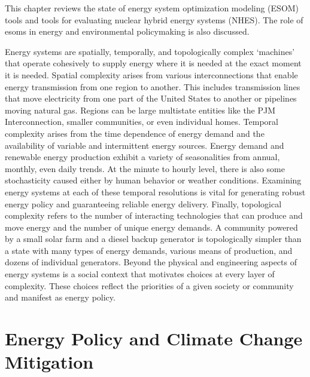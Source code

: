 This chapter reviews the state of energy system optimization modeling (ESOM) tools
and tools for evaluating nuclear hybrid energy systems (NHES). The role of \glspl{esom}
in energy and environmental policymaking is also discussed.

Energy systems are spatially, temporally, and topologically complex ‘machines’
that operate cohesively to supply energy where it is needed at the exact moment
it is needed. Spatial complexity arises from various interconnections that enable
energy transmission from one region to another. This includes transmission
lines that move electricity from one part of the United States to another or
pipelines moving natural gas. Regions can be large multistate entities like the
PJM Interconnection, smaller communities, or even individual homes. Temporal
complexity arises from the time dependence of energy demand and the availability of
variable and intermittent energy sources. Energy demand and renewable energy
production
exhibit a variety of seasonalities from annual, monthly, even daily trends.
At the minute to hourly level, there is also some stochasticity caused either by
human behavior or weather conditions.
Examining energy systems at each of these temporal resolutions is vital for
generating robust energy policy and guaranteeing reliable energy delivery. Finally,
topological complexity refers to the number of interacting technologies that can
produce and move energy and the number of unique energy demands.
A community powered by a small solar farm and a diesel
backup generator is topologically simpler than a state with many types of energy
demands, various means of production, and dozens of individual generators. Beyond
the physical and engineering aspects of energy systems is a social context that
motivates choices at every layer of complexity. These choices reflect the priorities
of a given society or community and manifest as energy policy.

\section{Energy Policy and Climate Change Mitigation}
\label{section:energy_policy}

